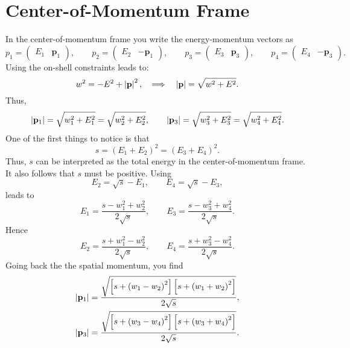 \section{Center-of-Momentum Frame}
In the center-of-momentum frame you write the energy-momentum vectors as
\begin{equation}
	p_{1} = \begin{pmatrix} E_{1} & \mathbf{p}_{1} \end{pmatrix}, \qquad p_{2} = \begin{pmatrix} E_{2} & -\mathbf{p}_{1} \end{pmatrix}, \qquad p_{3} = \begin{pmatrix} E_{3} & \mathbf{p}_{3} \end{pmatrix}, \qquad p_{4} = \begin{pmatrix} E_{4} & -\mathbf{p}_{3} \end{pmatrix}.
\end{equation}
Using the on-shell constraints leads to:
\begin{equation}
	w^{2} = -E^{2} + \left\lvert \mathbf{p} \right\rvert^{2}, \quad \Longrightarrow \quad \left\lvert \mathbf{p} \right\rvert = \sqrt{w^{2} + E^{2}}.
\end{equation}
Thus,
\begin{equation}
	\left\lvert \mathbf{p}_{1} \right\rvert = \sqrt{w_{1}^{2} + E_{1}^{2}} = \sqrt{w_{2}^{2} + E_{2}^{2}}, \qquad \left\lvert \mathbf{p}_{3} \right\rvert = \sqrt{w_{3}^{2} + E_{3}^{2}} = \sqrt{w_{4}^{2} + E_{4}^{2}}.
\end{equation}
One of the first things to notice is that
\begin{equation}
	s = (E_{1} + E_{2})^{2} = (E_{3} + E_{4})^{2}.
\end{equation}
Thus, $s$ can be interpreted as the total energy in the center-of-momentum frame. It also follows that $s$ must be positive. Using
\begin{equation}
	E_{2} = \sqrt{s} - E_{1}, \qquad E_{4} = \sqrt{s} - E_{3},
\end{equation}
leads to
\begin{equation}
	E_{1} = \frac{s - w_{1}^{2} + w_{2}^{2}}{2 \sqrt{s}} , \qquad E_{3} = \frac{s - w_{3}^{2} + w_{4}^{2}}{2 \sqrt{s}}.
\end{equation}
Hence
\begin{equation}
	E_{2} = \frac{s + w_{1}^{2} - w_{2}^{2}}{2 \sqrt{s}} , \qquad E_{4} = \frac{s + w_{3}^{2} - w_{4}^{2}}{2 \sqrt{s}}.
\end{equation}
Going back the the spatial momentum, you find
\begin{align}
	\left\lvert \mathbf{p}_{1} \right\rvert &= \frac{\sqrt{\left[ s + \left( w_{1} - w_{2} \right)^{2} \right] \left[ s + \left( w_{1} + w_{2} \right)^{2} \right]}}{2 \sqrt{s}}, \\
	\left\lvert \mathbf{p}_{3} \right\rvert &= \frac{\sqrt{\left[ s + \left( w_{3} - w_{4} \right)^{2} \right] \left[ s + \left( w_{3} + w_{4} \right)^{2} \right]}}{2 \sqrt{s}}.
\end{align}
